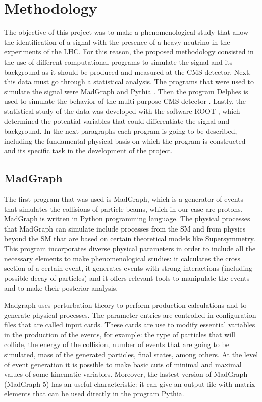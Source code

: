 \chapter{Methodology} 

The objective of this project was to make a phenomenological study that allow the identification of a signal with the presence of a heavy neutrino in the experiments of the LHC. For this reason, 
the proposed methodology consisted in the use of different computational programs to simulate the signal and its background as it should be produced and measured at the CMS detector. Next, this data must go through a statistical analysis. The programs that were used to simulate the signal were MadGraph \cite{MadGraph 1, MadGraph 2} and Pythia \cite{Pythia}. Then the program Delphes is used to simulate the behavior of the multi-purpose CMS detector \cite{Delphes}. Lastly, the statistical study of the data was developed with the software ROOT \cite{Root}, which determined the potential variables that could differentiate the signal and background. In the next paragraphs each program is going to be described, including the fundamental physical basis on which the program is constructed and its specific task in the development of the project.

\section{MadGraph}

The first program that was used is MadGraph, which is a generator of events that simulates the collisions of particle beams, which in our case are protons. MadGraph is written in Python programming language. The physical processes that MadGraph can simulate include processes from the SM and from physics beyond the SM that are based on certain theoretical models like Supersymmetry. This program incorporates diverse physical parameters in order to include all the necessary elements to make phenomenological studies: it calculates the cross section of a certain event, it generates events with strong interactions (including possible decay of particles) and it offers relevant tools to manipulate the events and to make their posterior analysis. 

Madgraph uses perturbation theory to perform production calculations and to generate physical processes. The parameter entries are controlled in configuration files that are called input cards. 
These cards are use to modify essential variables in the production of the events, for example: the type of particles that will collide, the energy of the collision, number of events that are going to be simulated, mass of the generated particles, final states, among others. At the level of event generation it is possible to make basic cuts of minimal and maximal values of some kinematic variables. Moreover, the lastest version of MadGraph (MadGraph 5) has an useful characteristic: it can give an output file with matrix elements that can be used directly in the program Pythia. 


